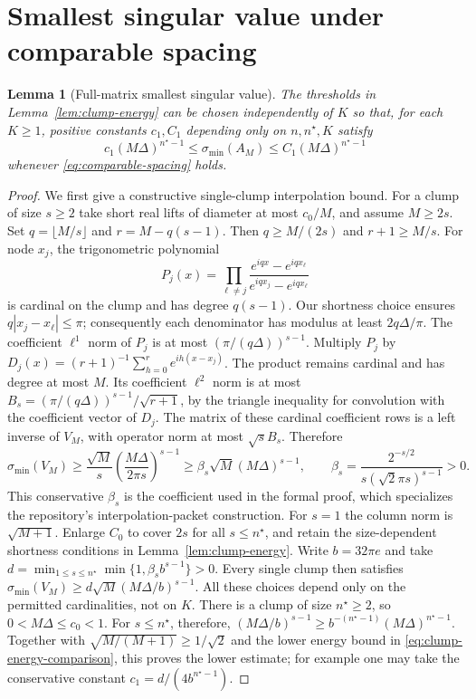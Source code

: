 \documentclass[11pt]{article}
\newtheorem{lemma}[theorem]{Lemma}
\theoremstyle{remark}\newtheorem{remark}[theorem]{Remark}
\newcommand{\abs}[1]{\left|#1\right|}
\begin{document}
\section{Smallest singular value under comparable spacing}
\begin{lemma}[Full-matrix smallest singular value]
\label{lem:full-clump-smallest}
The thresholds in Lemma~\ref{lem:clump-energy} can be chosen independently
of $K$ so that, for each $K\ge1$, positive constants $c_1,C_1$ depending
only on $n,n^\star,K$ satisfy
\[
 c_1(M\Delta)^{n^\star-1}\le\sigma_{\min}(A_M)
 \le C_1(M\Delta)^{n^\star-1}
\]
whenever \eqref{eq:comparable-spacing} holds.
\end{lemma}
\begin{proof}
We first give a constructive single-clump interpolation bound. For a
clump of size $s\ge2$ take short real lifts of diameter at most $c_0/M$,
and assume $M\ge2s$. Set $q=\lfloor M/s\rfloor$ and
$r=M-q(s-1)$. Then $q\ge M/(2s)$ and $r+1\ge M/s$.
For node $x_j$, the trigonometric polynomial
\[
 P_j(x)=\prod_{\ell\ne j}
       \frac{e^{iqx}-e^{iqx_\ell}}{e^{iqx_j}-e^{iqx_\ell}}
\]
is cardinal on the clump and has degree $q(s-1)$. Our shortness choice
ensures $q\abs{x_j-x_\ell}\le\pi$; consequently each denominator has
modulus at least $2q\Delta/\pi$. The coefficient $\ell^1$ norm of $P_j$
is at most $(\pi/(q\Delta))^{s-1}$.
Multiply $P_j$ by
$D_j(x)=(r+1)^{-1}\sum_{h=0}^{r}e^{ih(x-x_j)}$.
The product remains cardinal and has degree at most $M$. Its coefficient
$\ell^2$ norm is at most
$B_s=(\pi/(q\Delta))^{s-1}/\sqrt{r+1}$, by the triangle inequality for
convolution with the coefficient vector of $D_j$.
The matrix of these cardinal coefficient rows is a left inverse of $V_M$,
with operator norm at most $\sqrt sB_s$. Therefore
\[
 \sigma_{\min}(V_M)\ge\frac{\sqrt M}{s}
                \left(\frac{M\Delta}{2\pi s}\right)^{s-1}
 \ge\beta_s\sqrt M(M\Delta)^{s-1},\qquad
 \beta_s=\frac{2^{-s/2}}{s(\sqrt2\pi s)^{s-1}}>0.
\]
This conservative $\beta_s$ is the coefficient used in the formal proof,
which specializes the repository's interpolation-packet construction.
For $s=1$ the column norm is $\sqrt{M+1}$.
Enlarge $C_0$ to cover $2s$ for all $s\le n^\star$, and retain the
size-dependent shortness conditions in Lemma~\ref{lem:clump-energy}.
Write $b=32\pi e$ and take
$d=\min_{1\le s\le n^\star}\min\{1,\beta_sb^{s-1}\}>0$.
Every single clump then satisfies
$\sigma_{\min}(V_M)\ge d\sqrt M(M\Delta/b)^{s-1}$.
All these choices depend only on the permitted cardinalities, not on $K$.
There is a clump of size $n^\star\ge2$, so $0<M\Delta\le c_0<1$.
For $s\le n^\star$, therefore,
$(M\Delta/b)^{s-1}\ge b^{-(n^\star-1)}(M\Delta)^{n^\star-1}$.
Together with $\sqrt{M/(M+1)}\ge1/\sqrt2$ and the lower energy bound
in \eqref{eq:clump-energy-comparison}, this proves the lower estimate;
for example one may take the conservative constant
$c_1=d/(4b^{n^\star-1})$.


\end{proof}
\end{document}
